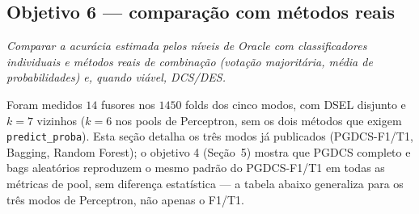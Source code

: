 \subsection{Objetivo 6 --- comparação com métodos reais}

\textit{Comparar a acurácia estimada pelos níveis de Oracle com classificadores
individuais e métodos reais de combinação (votação majoritária, média de
probabilidades) e, quando viável, DCS/DES.}

Foram medidos $14$ fusores nos $1450$ folds dos cinco modos, com DSEL disjunto e
$k=7$ vizinhos ($k=6$ nos pools de Perceptron, sem os dois métodos que exigem
\texttt{predict\_proba}). Esta seção detalha os três modos já publicados
(PGDCS-F1/T1, Bagging, Random Forest); o objetivo 4 (Seção~5) mostra que PGDCS
completo e bags aleatórios reproduzem o mesmo padrão do PGDCS-F1/T1 em todas as
métricas de pool, sem diferença estatística --- a tabela abaixo generaliza para os
três modos de Perceptron, não apenas o F1/T1.


